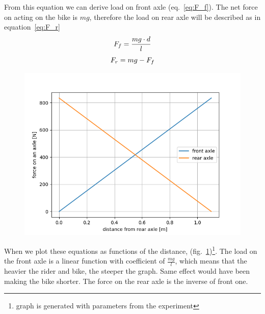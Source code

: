 \documentclass[12pt, a4]{article}
\begin{document}
From this equation we can derive load on front axle (eq.~\ref{eq:F_f}). The net force on acting 
on the bike is $mg$, therefore the load on rear axle will be described as in equation~\ref{eq:F_r}
\begin{equation}
\centering%
\label{eq:F_f}
F_f = \frac{mg \cdot d}{l}
\end{equation}
\begin{equation}
\centering%
\label{eq:F_r}
F_r = mg - F_f
\end{equation}

\begin{figure}[H]
\centering
\caption{}
\includegraphics[width=0.5\linewidth]{axles_static_graph}%
\label{fig:static_graph}
\end{figure}
When we plot these equations as functions of the distance, (fig.~\ref{fig:static_graph})\footnote[1]{graph is 
generated with parameters from the experiment}. The load on the front axle is a linear function with 
coefficient of $\frac{mg}{l}$, which means that the heavier the rider and bike, the steeper the graph.
Same effect would have been making the bike shorter. The force on the rear axle is the inverse of front one.
\end{document}
